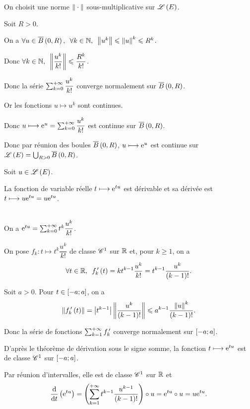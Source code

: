 \begin{dem}
On choisit une norme \(\norme{}\) sous-multiplicative sur \(\mathscr{L}\left(E\right)\).

Soit \(R>0\).

On a \(\quantifs{\forall u\in\boulef{0}{R};\forall k\in\N}\norme{u^k}\leq\norme{u}^k\leq R^k\).

Donc \(\quantifs{\forall k\in\N}\norme{\dfrac{u^k}{k!}}\leq\dfrac{R^k}{k!}\).

Donc la série \(\sum_{k=0}^{+\infty}\dfrac{u^k}{k!}\) converge normalement sur \(\boulef{0}{R}\).

Or les fonctions \(u\mapsto u^k\) sont continues.

Donc \(u\longmapsto\mathrm{e}^{u}=\sum_{k=0}^{+\infty}\dfrac{u^k}{k!}\) est continue sur \(\boulef{0}{R}\).

Donc par réunion des boules \(\boulef{0}{R}\), \(u\longmapsto\mathrm{e}^{u}\) est continue sur \(\Lendo{E}=\bigunion_{R>0}\boulef{0}{R}\).
\end{dem}

\begin{prop}
Soit \(u\in\mathscr{L}\left(E\right)\).

La fonction de variable réelle \(t\longmapsto\mathrm{e}^{tu}\) est dérivable et sa dérivée est \(t\longmapsto u\mathrm{e}^{tu}=u\mathrm{e}^{tu}\).
\end{prop}

\begin{dem}~\\
On a \(\mathrm{e}^{tu}=\sum_{k=0}^{+\infty}t^k\dfrac{u^k}{k!}\).

On pose \(f_k:t\mapsto t^k\dfrac{u^k}{k!}\) de classe \(\mathscr{C}^{1}\) sur \(\mathbb{R}\) et, pour \(k\geq1\), on a \[\quantifs{\forall t\in\R}f_k\prim\paren{t}=kt^{k-1}\dfrac{u^k}{k!}=t^{k-1}\dfrac{u^k}{\paren{k-1}!}.\]

Soit \(a>0\). Pour \(t\in\left[-a;a\right]\), on a \[\norme{f_k\prim\paren{t}}=\abs{t^{k-1}}\norme{\dfrac{u^k}{\paren{k-1}!}}\leq a^{k-1}\dfrac{\norme{u}^k}{\paren{k-1}!}.\]

Donc la série de fonctions \(\sum_{k=1}^{+\infty}f_k^{\,\prime}\) converge normalement sur \(\left[-a;a\right]\).

D'après le théorème de dérivation sous le signe somme, la fonction \(t\longmapsto\mathrm{e}^{tu}\) est de classe \(\mathscr{C}^{1}\) sur \(\left[-a;a\right]\).

Par réunion d'intervalles, elle est de classe \(\mathscr{C}^{1}\) sur \(\mathbb{R}\) et \[\odv*{\paren{\e{tu}}}{t}=\paren{\sum_{k=1}^{\pinf}t^{k-1}\dfrac{u^{k-1}}{\paren{k-1}!}}\rond u=\e{tu}\rond u=u\e{tu}.\]
\end{dem}

